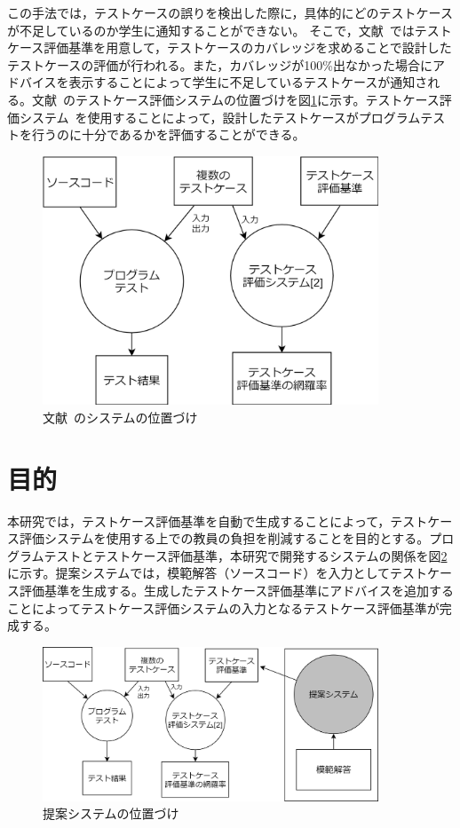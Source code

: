 \documentclass{tpu-sotu}
\begin{document}
この手法では，テストケースの誤りを検出した際に，具体的にどのテストケースが不足しているのか学生に通知することができない。
そこで，文献~\cite{a1}ではテストケース評価基準を用意して，テストケースのカバレッジを求めることで設計したテストケースの評価が行われる。また，カバレッジが100\%出なかった場合にアドバイスを表示することによって学生に不足しているテストケースが通知される。文献~\cite{a1}のテストケース評価システムの位置づけを図\ref{a3}に示す。テストケース評価システム~\cite{a1}を使用することによって，設計したテストケースがプログラムテストを行うのに十分であるかを評価することができる。
\begin{figure}[h]
  \centering
  \includegraphics[width=100mm]{文献[2]のシステムの位置づけ.png}
  \caption{文献~\cite{a1}のシステムの位置づけ}
  \label{a3}
\end{figure}
\section{目的}
本研究では，テストケース評価基準を自動で生成することによって，テストケース評価システムを使用する上での教員の負担を削減することを目的とする。プログラムテストとテストケース評価基準，本研究で開発するシステムの関係を図\ref{a4}に示す。提案システムでは，模範解答（ソースコード）を入力としてテストケース評価基準を生成する。生成したテストケース評価基準にアドバイスを追加することによってテストケース評価システムの入力となるテストケース評価基準が完成する。
\begin{figure}[h]
  \centering
  \includegraphics[width=100mm]{提案システムの位置づけ2.png}
  \caption{提案システムの位置づけ}
  \label{a4}
\end{figure}
\end{document}
